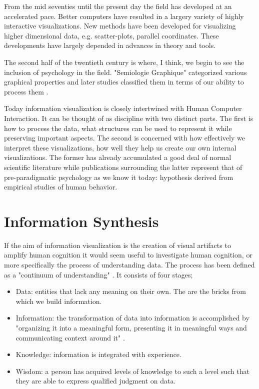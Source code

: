 \documentclass[a4paper, 10pt, titlepage]{article}
\begin{document}
From the mid seventies until the present day the field has developed at an accelerated pace. Better computers have resulted in a largery variety of highly interactive visualizations. New methods have been developed for visualizing higher dimensional data, e.g. scatter-plots, parallel coordinates. These developments have largely depended in advances in theory and tools.

The second half of the twentieth century is where, I think, we begin to see the inclusion of psychology in the field. "Semiologie Graphique" categorized various graphical properties and later studies classified them in terms of our ability to process them \cite{cleveland1984graphical}.

Today information visualization is closely intertwined with Human Computer Interaction. It can be thought of as discipline with two distinct parts. The first is how to process the data, what structures can be used to represent it while preserving important aspects. The second is concerned with how effectively we interpret these visualizations, how well they help us create our own internal visualizations. The former has already accumulated a good deal of normal scientific literature while publications surrounding the latter represent that of pre-paradigmatic psychology as we know it today: hypothesis derived from empirical studies of human behavior.


\section{Information Synthesis}
If the aim of information visualization is the creation of visual artifacts to amplify human cognition it would seem useful to investigate human cognition, or more specifically the process of understanding data. The process has been defined as a "continuum of understanding" \cite{jacobson1999information}. It consists of four stages;
\begin{itemize}
\item Data: entities that lack any meaning on their own. The are the bricks from which we build information.
\item Information: the transformation of data into information is accomplished by "organizing it into a meaningful form, presenting it in meaningful ways and communicating context around it" \cite{jacobson1999information}.
\item Knowledge: information is integrated with experience.
\item Wisdom: a person has acquired levels of knowledge to such a level such that they are able to express qualified judgment on data.
\end{itemize}
\end{document}
